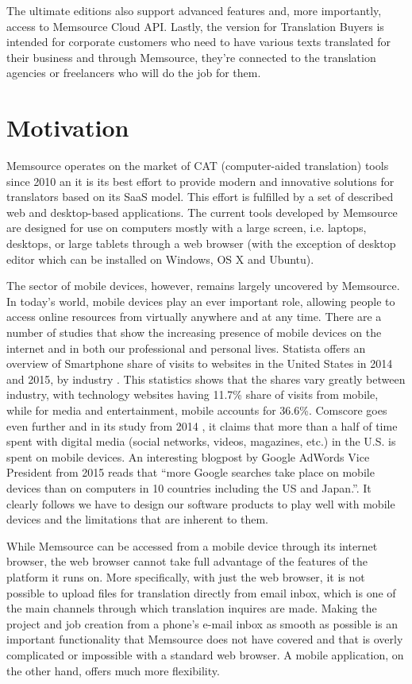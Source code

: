 The ultimate editions also support advanced features and, more importantly, access to Memsource Cloud API. Lastly, the version for Translation Buyers is intended for corporate customers who need to have various texts translated for their business and through Memsource, they're connected to the translation agencies or freelancers who will do the job for them. 


\section{Motivation}

Memsource operates on the market of CAT (computer-aided translation) tools since 2010 an it is its best effort to provide modern and innovative solutions for translators based on its SaaS model. This effort is fulfilled by a set of described web and desktop-based applications. The current tools developed by Memsource are designed for use on computers mostly with a large screen, i.e. laptops, desktops, or large tablets through a web browser (with the exception of desktop editor which can be installed on Windows, OS X and Ubuntu).

The sector of mobile devices, however, remains largely uncovered by Memsource. In today's world, mobile devices play an ever important role, allowing people to access online resources from virtually anywhere and at any time. There are a number of studies that show the increasing presence of mobile devices on the internet and in both our professional and personal lives. 
Statista  offers an overview of Smartphone share of visits to websites in the United States in 2014 and 2015, by industry \cite{statista}. This statistics shows that the shares vary greatly between industry, with technology websites having 11.7\% share of visits from mobile, while for media and entertainment, mobile accounts for 36.6\%. Comscore goes even further and in its study from 2014 \cite{comscore}, it claims that more than a half of time spent with digital media (social networks, videos, magazines, etc.) in the U.S. is spent on mobile devices. An interesting blogpost by Google AdWords Vice President from 2015 \cite{googleAdwords} reads that ``more Google searches take place on mobile devices than on computers in 10 countries including the US and Japan.''. It clearly follows we have to design our software products to play well with mobile devices and the limitations that are inherent to them. 

While Memsource can be accessed from a mobile device through its internet browser, the web browser cannot take full advantage of the features of the platform it runs on. More specifically, with just the web browser, it is not possible to upload files for translation directly from email inbox, which is one of the main channels through which translation inquires are made. Making the project and job creation from a phone's e-mail inbox as smooth as possible is an important functionality that Memsource does not have covered and that is overly complicated or impossible with a standard web browser. A mobile application, on the other hand, offers much more flexibility. 

